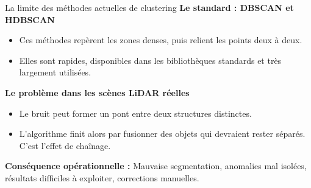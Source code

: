 \documentclass[A4,svgnames,10pt,aspectratio=169,usepdftitle=false]{beamer}
\begin{document}
\begin{frame}{La limite des méthodes actuelles de clustering}
    \textbf{\bleu Le standard : DBSCAN et HDBSCAN}
    \begin{itemize}
        \item Ces méthodes repèrent les zones denses, puis relient les points deux à deux.
        \item Elles sont rapides, disponibles dans les bibliothèques standards et très largement utilisées.
    \end{itemize}

    \vspace{0.25cm}
    \textbf{\bleu Le problème dans les scènes LiDAR réelles}
    \begin{itemize}
        \item Le bruit peut former un pont entre deux structures distinctes.
        \item L'algorithme finit alors par fusionner des objets qui devraient rester séparés. C'est l'effet de chaînage.
    \end{itemize}

    \vspace{0.25cm}
    \textbf{\orange Conséquence opérationnelle :} Mauvaise segmentation, anomalies mal isolées, résultats difficiles à exploiter, corrections manuelles.
\end{frame}
\end{document}
